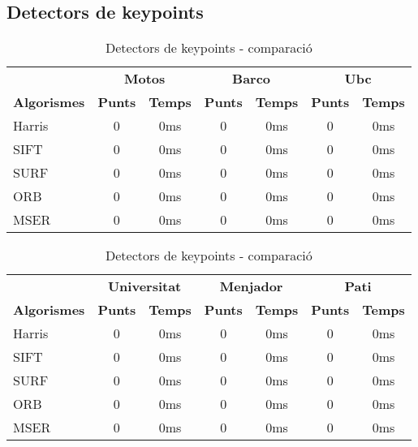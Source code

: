 	\subsection{Detectors de keypoints}
		\begin{table}[H]
			\begin{center}
				\begin{tabular}{l | c c | c c | c c}
					& \multicolumn{2}{c|}{\textbf{Motos}} & \multicolumn{2}{c|}{\textbf{Barco}} & \multicolumn{2}{c}{\textbf{Ubc}} \\
					\textbf{Algorismes} & \textbf{Punts} & \textbf{Temps} & \textbf{Punts} & \textbf{Temps} & \textbf{Punts} & \textbf{Temps} \\ \hline
					Harris & 0 & 0ms & 0 & 0ms & 0 & 0ms \\
					SIFT & 0 & 0ms & 0 & 0ms & 0 & 0ms \\
					SURF & 0 & 0ms & 0 & 0ms & 0 & 0ms \\
					ORB & 0 & 0ms & 0 & 0ms & 0 & 0ms \\
					MSER & 0 & 0ms & 0 & 0ms & 0 & 0ms \\
				\end{tabular}
			\end{center}
			\caption{Detectors de keypoints - comparació}
		\end{table}

		\begin{table}[H]
			\begin{center}
				\begin{tabular}{l | c c | c c | c c}
					& \multicolumn{2}{c|}{\textbf{Universitat}} & \multicolumn{2}{c|}{\textbf{Menjador}} & \multicolumn{2}{c}{\textbf{Pati}} \\
					\textbf{Algorismes} & \textbf{Punts} & \textbf{Temps} & \textbf{Punts} & \textbf{Temps} & \textbf{Punts} & \textbf{Temps} \\ \hline
					Harris & 0 & 0ms & 0 & 0ms & 0 & 0ms \\
					SIFT & 0 & 0ms & 0 & 0ms & 0 & 0ms \\
					SURF & 0 & 0ms & 0 & 0ms & 0 & 0ms \\
					ORB & 0 & 0ms & 0 & 0ms & 0 & 0ms \\
					MSER & 0 & 0ms & 0 & 0ms & 0 & 0ms \\
				\end{tabular}
			\end{center}
			\caption{Detectors de keypoints - comparació}
		\end{table}

